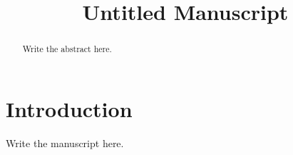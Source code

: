 \documentclass[11pt]{article}
\title{Untitled Manuscript}
\date{}
\begin{document}
\maketitle
\begin{abstract}
Write the abstract here.
\end{abstract}
\section{Introduction}
Write the manuscript here.
\end{document}

